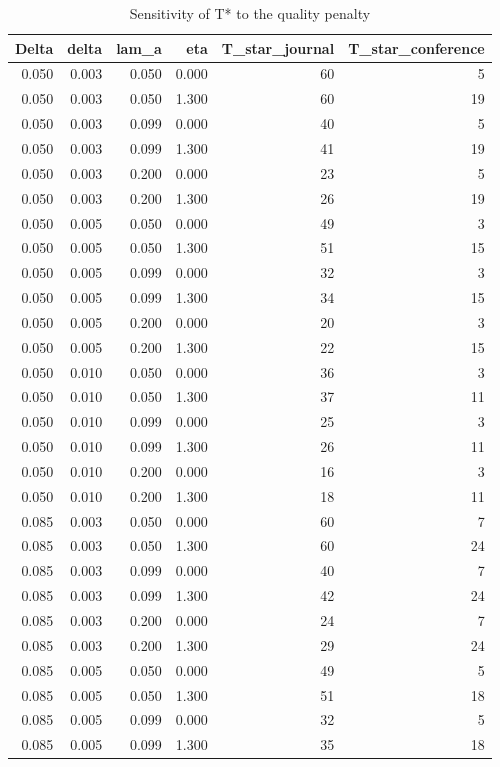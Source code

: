 \begin{table}
\caption{Sensitivity of T* to the quality penalty}
\label{tab:sens}
\begin{tabular}{rrrrrr}
\toprule
Delta & delta & lam\_a & eta & T\_star\_journal & T\_star\_conference \\
\midrule
0.050 & 0.003 & 0.050 & 0.000 & 60 & 5 \\
0.050 & 0.003 & 0.050 & 1.300 & 60 & 19 \\
0.050 & 0.003 & 0.099 & 0.000 & 40 & 5 \\
0.050 & 0.003 & 0.099 & 1.300 & 41 & 19 \\
0.050 & 0.003 & 0.200 & 0.000 & 23 & 5 \\
0.050 & 0.003 & 0.200 & 1.300 & 26 & 19 \\
0.050 & 0.005 & 0.050 & 0.000 & 49 & 3 \\
0.050 & 0.005 & 0.050 & 1.300 & 51 & 15 \\
0.050 & 0.005 & 0.099 & 0.000 & 32 & 3 \\
0.050 & 0.005 & 0.099 & 1.300 & 34 & 15 \\
0.050 & 0.005 & 0.200 & 0.000 & 20 & 3 \\
0.050 & 0.005 & 0.200 & 1.300 & 22 & 15 \\
0.050 & 0.010 & 0.050 & 0.000 & 36 & 3 \\
0.050 & 0.010 & 0.050 & 1.300 & 37 & 11 \\
0.050 & 0.010 & 0.099 & 0.000 & 25 & 3 \\
0.050 & 0.010 & 0.099 & 1.300 & 26 & 11 \\
0.050 & 0.010 & 0.200 & 0.000 & 16 & 3 \\
0.050 & 0.010 & 0.200 & 1.300 & 18 & 11 \\
0.085 & 0.003 & 0.050 & 0.000 & 60 & 7 \\
0.085 & 0.003 & 0.050 & 1.300 & 60 & 24 \\
0.085 & 0.003 & 0.099 & 0.000 & 40 & 7 \\
0.085 & 0.003 & 0.099 & 1.300 & 42 & 24 \\
0.085 & 0.003 & 0.200 & 0.000 & 24 & 7 \\
0.085 & 0.003 & 0.200 & 1.300 & 29 & 24 \\
0.085 & 0.005 & 0.050 & 0.000 & 49 & 5 \\
0.085 & 0.005 & 0.050 & 1.300 & 51 & 18 \\
0.085 & 0.005 & 0.099 & 0.000 & 32 & 5 \\
0.085 & 0.005 & 0.099 & 1.300 & 35 & 18 \\

\end{tabular}
\end{table}
